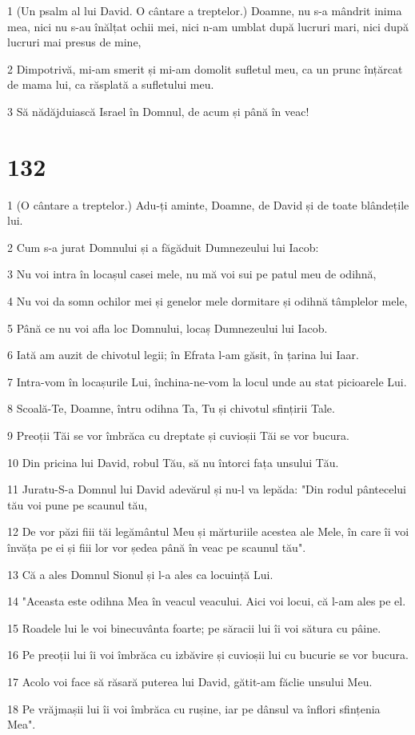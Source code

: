 \par 1 (Un psalm al lui David. O cântare a treptelor.) Doamne, nu s-a mândrit inima mea, nici nu s-au înălțat ochii mei, nici n-am umblat după lucruri mari, nici după lucruri mai presus de mine,
\par 2 Dimpotrivă, mi-am smerit și mi-am domolit sufletul meu, ca un prunc înțărcat de mama lui, ca răsplată a sufletului meu.
\par 3 Să nădăjduiască Israel în Domnul, de acum și până în veac!

\chapter{132}

\par 1 (O cântare a treptelor.) Adu-ți aminte, Doamne, de David și de toate blândețile lui.
\par 2 Cum s-a jurat Domnului și a făgăduit Dumnezeului lui Iacob:
\par 3 Nu voi intra în locașul casei mele, nu mă voi sui pe patul meu de odihnă,
\par 4 Nu voi da somn ochilor mei și genelor mele dormitare și odihnă tâmplelor mele,
\par 5 Până ce nu voi afla loc Domnului, locaș Dumnezeului lui Iacob.
\par 6 Iată am auzit de chivotul legii; în Efrata l-am găsit, în țarina lui Iaar.
\par 7 Intra-vom în locașurile Lui, închina-ne-vom la locul unde au stat picioarele Lui.
\par 8 Scoală-Te, Doamne, întru odihna Ta, Tu și chivotul sfințirii Tale.
\par 9 Preoții Tăi se vor îmbrăca cu dreptate și cuvioșii Tăi se vor bucura.
\par 10 Din pricina lui David, robul Tău, să nu întorci fața unsului Tău.
\par 11 Juratu-S-a Domnul lui David adevărul și nu-l va lepăda: "Din rodul pântecelui tău voi pune pe scaunul tău,
\par 12 De vor păzi fiii tăi legământul Meu și mărturiile acestea ale Mele, în care îi voi învăța pe ei și fiii lor vor ședea până în veac pe scaunul tău".
\par 13 Că a ales Domnul Sionul și l-a ales ca locuință Lui.
\par 14 "Aceasta este odihna Mea în veacul veacului. Aici voi locui, că l-am ales pe el.
\par 15 Roadele lui le voi binecuvânta foarte; pe săracii lui îi voi sătura cu pâine.
\par 16 Pe preoții lui îi voi îmbrăca cu izbăvire și cuvioșii lui cu bucurie se vor bucura.
\par 17 Acolo voi face să răsară puterea lui David, gătit-am făclie unsului Meu.
\par 18 Pe vrăjmașii lui îi voi îmbrăca cu rușine, iar pe dânsul va înflori sfințenia Mea".

